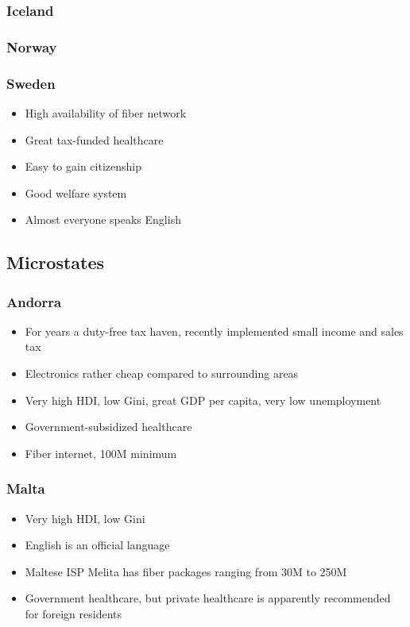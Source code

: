 \documentclass[12pt]{article}
\begin{document}
\subsubsection{Iceland}

\subsubsection{Norway}

\subsubsection{Sweden}
\begin{itemize}
\item High availability of fiber network
\item Great tax-funded healthcare
\item Easy to gain citizenship 
\item Good welfare system
\item Almost everyone speaks English
\end{itemize}


\subsection{Microstates}


\subsubsection{Andorra}

\begin{itemize}
\item For years a duty-free tax haven, recently implemented small income and sales tax
\item Electronics rather cheap compared to surrounding areas
\item Very high HDI, low Gini, great GDP per capita, very low unemployment
\item Government-subsidized healthcare
\item Fiber internet, 100M minimum
\end{itemize}



\subsubsection{Malta}

\begin{itemize}
\item Very high HDI, low Gini
\item English is an official language
\item Maltese ISP Melita has fiber packages ranging from 30M to 250M
\item Government healthcare, but private healthcare is apparently recommended for foreign residents
\end{itemize}
\end{document}
